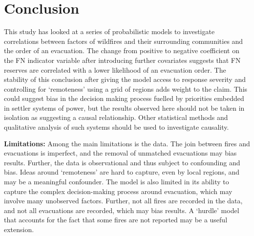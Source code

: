 \section{Conclusion}\label{sec:conclusion}

This study has looked at a series of probabilistic models to investigate correlations between factors of wildfires and their surrounding communities and the order of an evacuation. The change from positive to negative coefficient on the FN indicator variable after introducing further covariates suggests that FN reserves are correlated with a lower likelihood of an evacuation order. The stability of this conclusion after giving the model access to response severity and controlling for `remoteness' using a grid of regions adds weight to the claim. This could suggest bias in the decision making process fuelled by priorities embedded in settler systems of power, but the results observed here should not be taken in isolation as suggesting a causal relationship. Other statistical methods and qualitative analysis of such systems should be used to investigate causality.

\textbf{Limitations:} Among the main limitations is the data. The join between fires and evacuations is imperfect, and the removal of unmatched evacuations may bias results. Further, the data is observational and thus subject to confounding and bias. Ideas around `remoteness' are hard to capture, even by local regions, and may be a meaningful confounder. The model is also limited in its ability to capture the complex decision-making process around evacuation, which may involve many unobserved factors. Further, not all fires are recorded in the data, and not all evacuations are recorded, which may bias results. A `hurdle' model that accounts for the fact that some fires are not reported may be a useful extension.